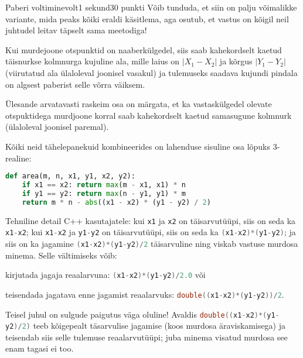 \begin{yl}{3}{Paberi voltimine}{volt}{1 sekund}{30 punkti}
  Võib tunduda, et siin on palju võimalikke variante, mida peaks kõiki eraldi käsitlema, aga osutub, et vastus on kõigil neil juhtudel leitav täpselt sama meetodiga!

  \begin{center}
  \hspace{1cm}
  \end{center}

  Kui murdejoone otspunktid on naaberkülgedel, siis saab kahekordselt kaetud täisnurkse kolmnurga kujuline ala, mille laius on $|X_1 - X_2|$ ja kõrgus $|Y_1 - Y_2|$ (viirutatud ala ülaloleval joonisel vasakul) ja tulemuseks saadava kujundi pindala on algsest paberist selle võrra väiksem.

  Ülesande arvatavasti raskeim osa on märgata, et ka vastaskülgedel olevate otspuktidega murdjoone korral saab kahekordselt kaetud samasugune kolmnurk (ülaloleval joonisel paremal).

  Kõiki neid tähelepanekuid kombineerides on lahenduse sisuline osa lõpuks 3-realine:
  \begin{lstlisting}[language=Python]
  def area(m, n, x1, y1, x2, y2):
    if x1 == x2: return max(m - x1, x1) * n
    if y1 == y2: return max(n - y1, y1) * m
    return m * n - abs((x1 - x2) * (y1 - y2) / 2)
  \end{lstlisting}

  \clearpage
  Tehniline detail C++ kasutajatele: kui \lstinline[language=C++]{x1} ja \lstinline[language=C++]{x2} on täisarvutüüpi, siis on seda ka \lstinline[language=C++]{x1-x2}; kui \lstinline[language=C++]{x1-x2} ja \lstinline[language=C++]{y1-y2} on täisarvutüüpi, siis on seda ka \lstinline[language=C++]{(x1-x2)*(y1-y2)}; ja siis on ka jagamine \lstinline[language=C++]{(x1-x2)*(y1-y2)/2} täisarvuline ning viskab vastuse murdosa minema. Selle vältimiseks võib:
  \begin{xitem}
    \item kirjutada jagaja reaalarvuna: \lstinline[language=C++]{(x1-x2)*(y1-y2)/2.0} või
    \item teisendada jagatava enne jagamist reaalarvuks: \lstinline[language=C++]{double((x1-x2)*(y1-y2))/2}.
  \end{xitem}
  Teisel juhul on sulgude paigutus väga oluline! Avaldis \lstinline[language=C++]{double((x1-x2)*(y1-y2)/2)} teeb kõigepealt täsarvulise jagamise (koos murdosa äraviskamisega) ja teisendab siis selle tulemuse reaalarvutüüpi; juba minema visatud murdosa see enam tagasi ei too.
\end{yl}
